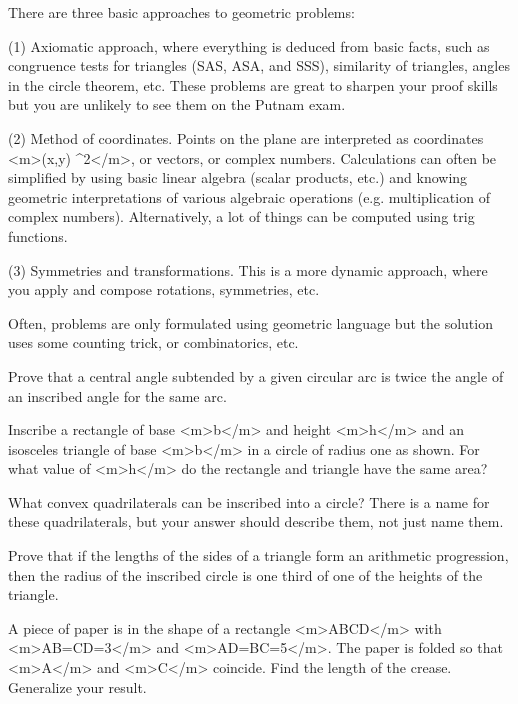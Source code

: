 



There are three basic approaches to geometric problems:



(1) Axiomatic approach, where everything is deduced from basic facts, such as congruence tests for triangles (SAS, ASA, and SSS), similarity of triangles,
angles in the circle theorem, etc. These problems are great to sharpen your proof skills but you are unlikely to see them on the Putnam exam.



(2) Method of coordinates. Points on the plane are interpreted as coordinates <m>(x,y) \in {}^2</m>, or vectors, or complex numbers. Calculations
can often be simplified by using basic linear algebra (scalar products, etc.) and knowing geometric interpretations of various algebraic operations
(e.g. multiplication of complex numbers). Alternatively, a lot of things can be computed using trig functions.



(3) Symmetries and transformations. This is a more dynamic approach, where you apply and compose rotations, symmetries, etc.



Often, problems are only formulated using geometric language but the solution uses some counting trick, or combinatorics, etc.





Prove that a central angle subtended by a given circular arc is twice the angle of an inscribed angle for the same arc.

Inscribe a rectangle of base <m>b</m> and height <m>h</m> and an isosceles triangle of base <m>b</m> in a circle of radius one as shown. { }For what value
of <m>h</m> do the rectangle and triangle have the same area? 



What convex quadrilaterals can be inscribed into a circle? { }There is a name for these quadrilaterals, but your answer should describe them, not
just name them.

 Prove that if the lengths of the sides of a triangle form an arithmetic progression, then the radius of the inscribed circle is one third of one
of the heights of the triangle.

A piece of paper is in the shape of a rectangle <m>ABCD</m> with <m>AB=CD=3</m> and <m>AD=BC=5</m>.
{ }The paper is folded so that <m>A</m> and <m>C</m> coincide. { }Find the length of the crease. { } Generalize your result.

